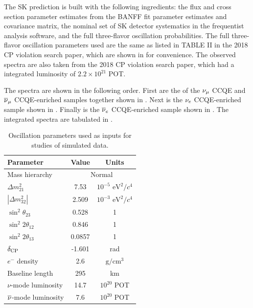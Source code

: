 The SK prediction is built with the following ingredients: the flux
and cross section parameter estimates from the BANFF fit parameter
estimates and covariance matrix, the nominal set of SK detector systematics
in the frequentist analysis software, and the full three-flavor oscillation
probabilities. The full three-flavor oscillation parameters used are
the same as listed in TABLE II in the 2018 CP violation search paper\cite{Abe:2018wpn},
which are shown in  for
convenience. The observed spectra are also taken from the 2018 CP
violation search paper, which had a integrated luminosity of $2.2\times10^{21}$
POT.

The spectra are shown in the following order. First are the of the
$\nu_{\mu}$ CCQE and $\overline{\nu}_{\mu}$ CCQE-enriched samples together shown
in . Next is the
$\nu_{e}$ CCQE-enriched sample shown in .
Finally is the $\overline{\nu}_{e}$ CCQE-enriched sample shown in .
The integrated spectra are tabulated in .

\begin{table}
\caption[Oscillation Parameters Used as Inputs for Studies of Simulated Data]{Oscillation parameters used as inputs for studies of simulated data.\label{tab:Oscillation-parameters-used}}

\centering{}%
\begin{tabular}{lcc}
\toprule 
Parameter & Value & Units\tabularnewline
\midrule
\midrule 
Mass hierarchy & \multicolumn{2}{c}{Normal}\tabularnewline
$\Delta m_{21}^{2}$ & 7.53 & $10^{-5}\text{ eV}^{2}/c^{4}$\tabularnewline
$\left|\Delta m_{32}^{2}\right|$ & 2.509 & $10^{-3}\text{ eV}^{2}/c^{4}$\tabularnewline
$\sin^{2}\theta_{23}$ & 0.528 & 1\tabularnewline
$\sin^{2}2\theta_{12}$ & 0.846 & 1\tabularnewline
$\sin^{2}2\theta_{13}$ & 0.0857 & 1\tabularnewline
$\delta_{\text{CP}}$ & -1.601 & rad\tabularnewline
$e^{-}$ density & 2.6 & $\text{g}/\text{cm}^{3}$\tabularnewline
Baseline length & 295 & km\tabularnewline
$\nu$-mode luminosity & 14.7 & $10^{20}$ POT\tabularnewline
$\overline{\nu}$-mode luminosity & 7.6 & $10^{20}$ POT\tabularnewline
\bottomrule
\end{tabular}
\end{table}

